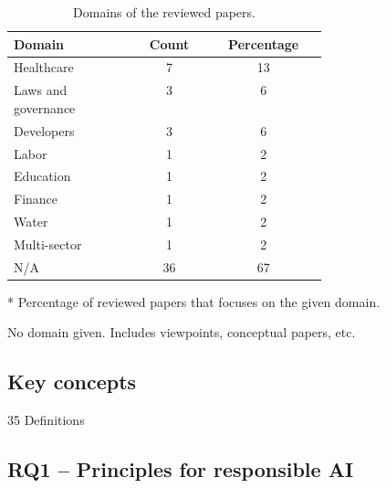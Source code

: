 \begin{table}[htpb]
    \centering
    \caption{Domains of the reviewed papers.}
    \label{tab:summary-domain}
    \begin{threeparttable}
    \begin{tabular}{p{0.4\linewidth}cc}
    \toprule
        \textbf{Domain} & \textbf{Count} & \textbf{Percentage}\tnote{*} \\
    \midrule
        Healthcare              & 7     & 13 \\ 
        Laws and governance     & 3     & 6 \\
        Developers              & 3     & 6 \\
        Labor                   & 1     & 2 \\
        Education               & 1     & 2 \\
        Finance                 & 1     & 2 \\
        Water                   & 1     & 2 \\
        Multi-sector            & 1     & 2 \\
        N/A\tnote{\textdagger}  & 36    & 67 \\ 
    \bottomrule
    \end{tabular}
    \begin{tablenotes}
        \footnotesize
        \item [*] Percentage of reviewed papers that focuses on the given domain.
        \item [\textdagger] No domain given. Includes viewpoints, conceptual papers, etc.
    \end{tablenotes}
\end{threeparttable}
\end{table}





\subsection{Key concepts}
{35 Definitions}


\subsection{RQ1 -- Principles for responsible AI}
\label{sec:results-rq1}

